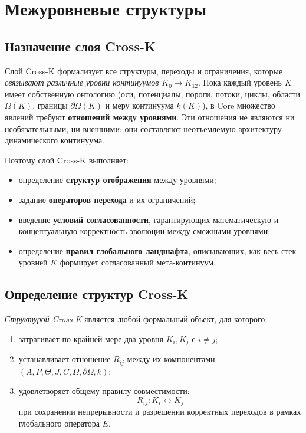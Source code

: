 
\section{Межуровневые структуры}
\label{sec:crossk_master}

\subsection{Назначение слоя Cross-K}
Слой Cross-K формализует все структуры, переходы и ограничения,
которые \emph{связывают различные уровни континуумов $K_0 \rightarrow K_{12}$}.
Пока каждый уровень $K$ имеет собственную онтологию (оси, потенциалы,
пороги, потоки, циклы, области $\Omega(K)$, границы $\partial\Omega(K)$ и
меру континуума $k(K)$), в Core множество явлений требуют
\textbf{отношений между уровнями}. Эти отношения не являются ни
необязательными, ни внешними: они составляют неотъемлемую архитектуру
динамического континуума.

Поэтому слой Cross-K выполняет:
\begin{itemize}
  \item определение \textbf{структур отображения} между уровнями;
  \item задание \textbf{операторов перехода} и их ограничений;
  \item введение \textbf{условий согласованности}, гарантирующих математическую
        и концептуальную корректность эволюции между смежными уровнями;
  \item определение \textbf{правил глобального ландшафта}, описывающих, как
        весь стек уровней $K$ формирует согласованный мета-континуум.
\end{itemize}

\subsection{Определение структур Cross-K}
 \emph{Структурой Cross-K} является любой формальный объект, для которого:
\begin{enumerate}
  \item затрагивает по крайней мере два уровня $K_i, K_j$ с $i \neq j$;
  \item устанавливает отношение $R_{ij}$ между их компонентами
        $(A,P,\Theta,J,C,\Omega,\partial\Omega,k)$;
  \item удовлетворяет общему правилу совместимости:
        \[
        R_{ij} : K_i \leftrightarrow K_j
        \]
        при сохранении непрерывности и разрешении корректных переходов в рамках
        глобального оператора $E$.
\end{enumerate}

